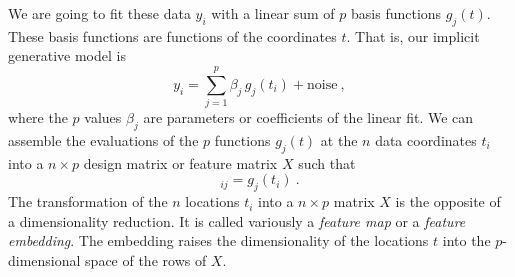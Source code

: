 \documentclass[12pt,letterpaper]{article}
\begin{document}
We are going to fit these data $y_i$ with a linear sum of $p$ basis functions $g_j(t)$. These basis functions are functions of the coordinates $t$. That is, our implicit generative model is
\begin{equation}
    y_i = \sum_{j=1}^p \beta_j\,g_j(t_i) + \mathrm{noise}
    ~,
\label{eq.model}
\end{equation}
where the $p$ values $\beta_j$ are parameters or coefficients of the linear fit. We can assemble the evaluations of the $p$ functions $g_j(t)$ at the $n$ data coordinates $t_i$ into a $n\times p$ design matrix or feature matrix $X$ such that
\begin{equation}
    [X]_{ij} = g_j(t_i)
    ~.
\end{equation}
The transformation of the $n$ locations $t_i$ into a $n\times p$ matrix $X$ is the opposite of a dimensionality reduction.
It is called variously a \emph{feature map} or a \emph{feature embedding}.
The embedding raises the dimensionality of the locations $t$ into the $p$-dimensional space of the rows of $X$.
\end{document}
